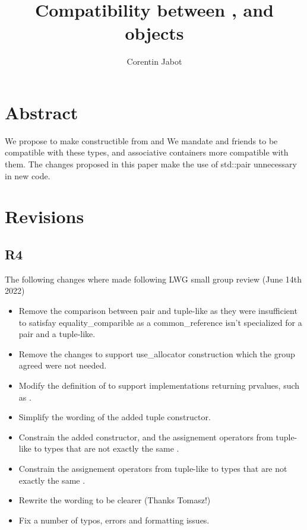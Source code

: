 \documentclass{wg21}
\title{Compatibility between \tcode{tuple}, \tcode{pair} and \placeholder{tuple-like} objects}
\author{Corentin Jabot}{corentin.jabot@gmail.com}
\begin{document}
\maketitle


\section{Abstract}

We propose to make  constructible from  and 
We mandate  and friends to be compatible with these types,
and associative containers more compatible with them.
The changes proposed in this paper make the use of std::pair unnecessary in new code.

\section{Revisions}

\subsection{R4}

The following changes where made following LWG small group review (June 14th 2022)

\begin{itemize}
\item Remove the comparison between pair and tuple-like as they were insufficient to satisfay equality_comparible as a common_reference isn't specialized for a pair and a tuple-like.
\item Remove the changes to support use_allocator construction which the group agreed were not needed.
\item Modify the definition of  to support  implementations returning prvalues, such as .
\item Simplify the wording of the added tuple constructor.
\item Constrain the added  constructor, and the  assignement operators from tuple-like to types that are not exactly the same .
\item Constrain the  assignement operators from tuple-like to types that are not exactly the same .
\item Rewrite the  wording to be clearer (Thanks Tomasz!)
\item Fix a number of typos, errors and formatting issues.
\end{itemize}
\end{document}
